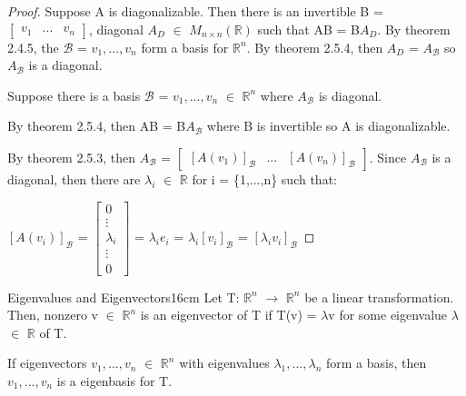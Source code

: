     \begin{proof}
        Suppose A is diagonalizable.
        Then there is an invertible B =
        $\begin{bmatrix}
            v_1 & ... & v_n
        \end{bmatrix}$, diagonal $A_D$
        $\in$ $M_{n \times n}(\mathbb{R})$
        such that AB = B$A_D$.
        By {\color{red} theorem 2.4.5}, the $\mathcal{B}$ = $v_1,...,v_n$ form a
        basis for $\mathbb{R}^n$. 
        By {\color{red} theorem 2.5.4}, then $A_D$ = $A_{\mathcal{B}}$
        so $A_{\mathcal{B}}$ is a diagonal.

        \vspace{0.3cm}

        Suppose there is a basis $\mathcal{B}$ = $v_1,...,v_n$ $\in$ $\mathbb{R}^n$
        where $A_{\mathcal{B}}$ is diagonal.

        By {\color{red} theorem 2.5.4}, then AB = B$A_{\mathcal{B}}$
        where B is invertible so A is diagonalizable.

        \vspace{0.3cm}

        By {\color{red} theorem 2.5.3}, then
        $A_{\mathcal{B}}$ =
        $\begin{bmatrix}
            [A(v_1)]_{\mathcal{B}} & ... & [A(v_n)]_{\mathcal{B}}
        \end{bmatrix}$.
        Since $A_{\mathcal{B}}$ is a diagonal, then there are
        $\lambda_i$ $\in$ $\mathbb{R}$ for i = \{1,...,n\} such that:

        \hspace{0.5cm}
        $[A(v_i)]_{\mathcal{B}}$ =
        $\begin{bmatrix}
            0 \\
            \vdots \\
            \lambda_i \\
            \vdots \\
            0
        \end{bmatrix}$
        = $\lambda_i e_i$
        = $\lambda_i [v_i]_{\mathcal{B}}$
        = $[\lambda_i v_i]_{\mathcal{B}}$
    \end{proof}

    \newpage



    \begin{definition}{Eigenvalues and Eigenvectors}{16cm}
        Let T: $\mathbb{R}^n$ $\rightarrow$ $\mathbb{R}^n$
        be a linear transformation.
        Then, nonzero v $\in$ $\mathbb{R}^n$ is an
        {\color{lblue} eigenvector} of T if T(v) = $\lambda$v
        for some {\color{lblue} eigenvalue} $\lambda$ $\in$ $\mathbb{R}$ of T.

        If eigenvectors $v_1,...,v_n$ $\in$ $\mathbb{R}^n$
        with eigenvalues $\lambda_1,...,\lambda_n$ form a basis, then
        $v_1,...,v_n$ is a {\color{lblue} eigenbasis} for T.
    \end{definition}

